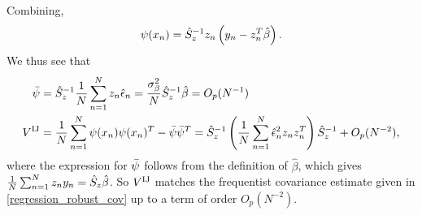 %
%
Combining,
%
\begin{align*}
%
\infl(\x_n) = \hat{S}_z^{-1} z_n \left(y_n - z_n^T \hat\beta\right).
%
\end{align*}
%
We thus see that
%
\begin{align*}
%
\bar{\infl} ={}& \hat{S}_z^{-1} \meann z_n \hat\epsilon_n =
    \frac{\sigma_\beta^2}{N} \hat{S}_z^{-1} \hat\beta = O_p(N^{-1})\\
\gcovij ={}&
\meann \infl(\x_n) \infl(\x_n)^T -  \bar{\infl} \bar{\infl}^T =
    \hat{S}_z^{-1} \left(
        \meann \hat\epsilon_n^2 z_n z_n^T \right)
    \hat{S}_z^{-1} + O_p(N^{-2}),
%
\end{align*}
%
where the expression for $\bar{\psi}$ follows from the definition of $\hat\beta$,
which gives $\frac{1}{N}\sum_{n=1}^N z_n y_n = \hat{S}_z \hat\beta$.  So $V^{\mathrm{IJ}}$ matches the
frequentist covariance estimate given in \eqref{regression_robust_cov} up to a
term of order $O_p(N^{-2})$.
